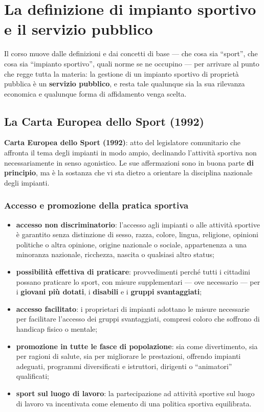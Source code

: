 \chapter{La definizione di impianto sportivo e il servizio pubblico}

Il corso muove dalle definizioni e dai concetti di base --- che cosa sia ``sport'', che cosa sia
``impianto sportivo'', quali norme se ne occupino --- per arrivare al punto che regge tutta la
materia: la gestione di un impianto sportivo di proprietà pubblica è un \textbf{servizio
pubblico}, e resta tale qualunque sia la sua rilevanza economica e qualunque forma di
affidamento venga scelta.

\section{La Carta Europea dello Sport (1992)}

\textbf{Carta Europea dello Sport (1992)}: atto del legislatore comunitario che affronta il tema
degli impianti in modo ampio, declinando l'attività sportiva non necessariamente in senso
agonistico. Le sue affermazioni sono in buona parte \textbf{di principio}, ma è la sostanza che
vi sta dietro a orientare la disciplina nazionale degli impianti.

\subsection{Accesso e promozione della pratica sportiva}

\begin{itemize}
  \item \textbf{accesso non discriminatorio}: l'accesso agli impianti o alle attività sportive è
    garantito senza distinzione di sesso, razza, colore, lingua, religione, opinioni politiche o
    altra opinione, origine nazionale o sociale, appartenenza a una minoranza nazionale,
    ricchezza, nascita o qualsiasi altro status;
  \item \textbf{possibilità effettiva di praticare}: provvedimenti perché tutti i cittadini
    possano praticare lo sport, con misure supplementari --- ove necessario --- per i
    \textbf{giovani più dotati}, i \textbf{disabili} e i \textbf{gruppi svantaggiati};
  \item \textbf{accesso facilitato}: i proprietari di impianti adottano le misure necessarie per
    facilitare l'accesso dei gruppi svantaggiati, compresi coloro che soffrono di handicap fisico
    o mentale;
  \item \textbf{promozione in tutte le fasce di popolazione}: sia come divertimento, sia per
    ragioni di salute, sia per migliorare le prestazioni, offrendo impianti adeguati, programmi
    diversificati e istruttori, dirigenti o ``animatori'' qualificati;
  \item \textbf{sport sul luogo di lavoro}: la partecipazione ad attività sportive sul luogo di
    lavoro va incentivata come elemento di una politica sportiva equilibrata.
\end{itemize}

